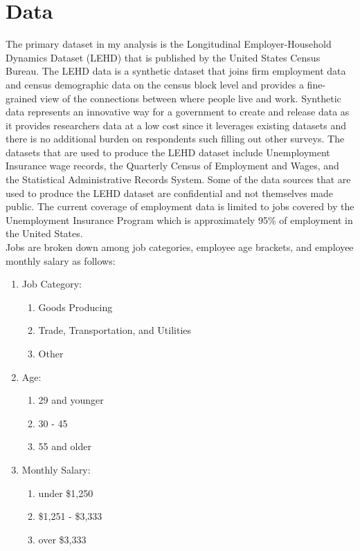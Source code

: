 \documentclass{article}
\theoremstyle{definition}
\theoremstyle{remark}
\begin{document}
\section{Data}
The primary dataset in my analysis is the Longitudinal Employer-Household Dynamics Dataset (LEHD) that is published by the United States Census Bureau.  The LEHD data is a synthetic dataset that joins firm employment data and census demographic data on the census block level and provides a fine-grained view of the connections between where people live and work.  Synthetic data represents an innovative way for a government to create and release data as it provides researchers data at a low cost since it leverages existing datasets and there is no additional burden on respondents such filling out other surveys.  The datasets that are used to produce the LEHD dataset include Unemployment Insurance wage records, the Quarterly Census of Employment and Wages, and the Statistical Administrative Records System.  Some of the data sources that are used to produce the LEHD dataset are confidential and not themselves made public.  The current coverage of employment data is limited to jobs covered by the Unemployment Insurance Program which is approximately 95\% of employment in the United States.  \\

Jobs are broken down among job categories, employee age brackets, and employee monthly salary as follows:
\begin{enumerate}
\item Job Category:
    \begin{enumerate}
        \item Goods Producing
        \item Trade, Transportation, and Utilities
        \item Other
    \end{enumerate}
\item Age:
    \begin{enumerate}
        \item 29 and younger
        \item 30 - 45
        \item 55 and older
    \end{enumerate}
\item Monthly Salary:
    \begin{enumerate}
        \item under \$1,250
        \item \$1,251 - \$3,333
        \item over \$3,333
    \end{enumerate}
\end{enumerate}
\end{document}
